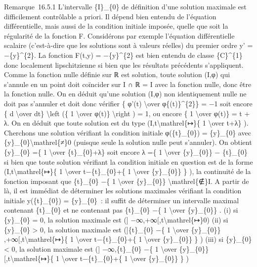 \documentclass[]{article}
\begin{document}
Remarque~16.5.1 L'intervalle \{I\}\_\{0\} de définition d'une solution
maximale est difficilement contrôlable a priori. Il dépend bien entendu
de l'équation différentielle, mais aussi de la condition initiale
imposée, quelle que soit la régularité de la fonction F. Considérons par
exemple l'équation différentielle scalaire (c'est-à-dire que les
solutions sont à valeurs réelles) du premier ordre y' = −\{y\}\^{}\{2\}.
La fonction F(t,y) = −\{y\}\^{}\{2\} est bien entendu de classe
\{C\}\^{}\{1\} donc localement lipschitzienne si bien que les résultats
précédents s'appliquent. Comme la fonction nulle définie sur ℝ est
solution, toute solution (I,φ) qui s'annule en un point doit coïncider
sur I ∩ ℝ = I avec la fonction nulle, donc être la fonction nulle. On en
déduit qu'une solution (I,φ) non identiquement nulle ne doit pas
s'annuler et doit donc vérifier \{ φ'(t) \textbackslash{}over
φ\{(t)\}\^{}\{2\}\} = −1 soit encore \{ d \textbackslash{}over dt\}
\textbackslash{}left (\{ 1 \textbackslash{}over φ(t)\}
\textbackslash{}right ) = 1, ou encore \{ 1 \textbackslash{}over φ(t)\}
= t + λ. On en déduit que toute solution est du type
(I,t\textbackslash{}mathrel\{↦\}\{ 1 \textbackslash{}over t+λ\} ).
Cherchons une solution vérifiant la condition initiale φ(\{t\}\_\{0\}) =
\{y\}\_\{0\} avec \{y\}\_\{0\}\textbackslash{}mathrel\{≠\}0 (puisque
seule la solution nulle peut s'annuler). On obtient \{y\}\_\{0\} =\{ 1
\textbackslash{}over \{t\}\_\{0\}+λ\} soit encore λ =\{ 1
\textbackslash{}over \{y\}\_\{0\}\} − \{t\}\_\{0\} si bien que toute
solution vérifiant la condition initiale en question est de la forme
(I,t\textbackslash{}mathrel\{↦\}\{ 1 \textbackslash{}over
t−\{t\}\_\{0\}+\{ 1 \textbackslash{}over \{y\}\_\{0\}\} \} ), la
continuité de la fonction imposant que \{t\}\_\{0\} −\{ 1
\textbackslash{}over \{y\}\_\{0\}\} \textbackslash{}mathrel\{∉\}I. A
partir de là, il est immédiat de déterminer les solutions maximales
vérifiant la condition initiale y(\{t\}\_\{0\}) = \{y\}\_\{0\}~: il
suffit de déterminer un intervalle maximal contenant \{t\}\_\{0\} et ne
contenant pas \{t\}\_\{0\} −\{ 1 \textbackslash{}over \{y\}\_\{0\}\} .
(i) si \{y\}\_\{0\} = 0, la solution maximale est ({]}
−∞,+∞{[},t\textbackslash{}mathrel\{↦\}0) (ii) si \{y\}\_\{0\}
\textgreater{} 0, la solution maximale est ({]}\{t\}\_\{0\} −\{ 1
\textbackslash{}over \{y\}\_\{0\}\}
,+∞{[},t\textbackslash{}mathrel\{↦\}\{ 1 \textbackslash{}over
t−\{t\}\_\{0\}+\{ 1 \textbackslash{}over \{y\}\_\{0\}\} \} ) (iii) si
\{y\}\_\{0\} \textless{} 0, la solution maximale est ({]}
−∞,\{t\}\_\{0\} −\{ 1 \textbackslash{}over \{y\}\_\{0\}\}
{[},t\textbackslash{}mathrel\{↦\}\{ 1 \textbackslash{}over
t−\{t\}\_\{0\}+\{ 1 \textbackslash{}over \{y\}\_\{0\}\} \} )
\end{document}
